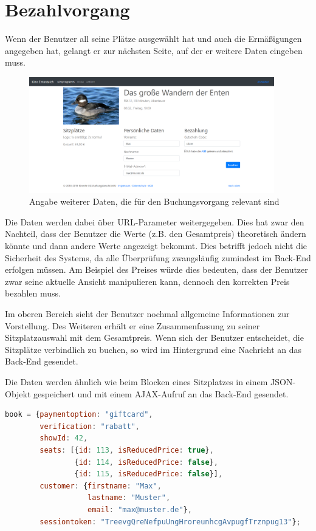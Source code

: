 \section{Bezahlvorgang}

Wenn der Benutzer all seine Plätze ausgewählt hat und auch die Ermäßigungen angegeben hat, gelangt er zur nächsten Seite, auf der er weitere Daten eingeben muss.

\begin{figure}[ht]
	\centering
	\includegraphics[width=0.95\textwidth]{img/screenshots/vorstellung03}
	\captionsetup{format=hang}
	\caption{Angabe weiterer Daten, die für den Buchungsvorgang relevant sind}
	\label{fig:vorstellung03}
\end{figure}

Die Daten werden dabei über \acs{URL}-Parameter weitergegeben.
Dies hat zwar den Nachteil, dass der Benutzer die Werte (z.B. den Gesamtpreis) theoretisch ändern könnte und dann andere Werte angezeigt bekommt.
Dies betrifft jedoch nicht die Sicherheit des Systems, da alle Überprüfung zwangsläufig zumindest im Back-End erfolgen müssen.
Am Beispiel des Preises würde dies bedeuten, dass der Benutzer zwar seine aktuelle Ansicht manipulieren kann, dennoch den korrekten Preis bezahlen muss.

Im oberen Bereich sieht der Benutzer nochmal allgemeine Informationen zur Vorstellung.
Des Weiteren erhält er eine Zusammenfassung zu seiner Sitzplatzauswahl mit dem Gesamtpreis.
Wenn sich der Benutzer entscheidet, die Sitzplätze verbindlich zu buchen, so wird im Hintergrund eine Nachricht an das Back-End gesendet.

Die Daten werden ähnlich wie beim Blocken eines Sitzplatzes in einem \acs{JSON}-Objekt gespeichert und mit einem \acs{AJAX}-Aufruf an das Back-End gesendet.

\begin{lstlisting}[language=JavaScript, caption={\acs{JSON}-Objekt für den Reservierungsvorgang}, label={lst:json_book}]
book = {paymentoption: "giftcard",
        verification: "rabatt",
        showId: 42,
        seats: [{id: 113, isReducedPrice: true},
                {id: 114, isReducedPrice: false},
                {id: 115, isReducedPrice: false}],
        customer: {firstname: "Max",
                   lastname: "Muster",
                   email: "max@muster.de"},
        sessiontoken: "TreevgQreNefpuUngHroreunhcgAvpugfTrznpug13"};
\end{lstlisting}

